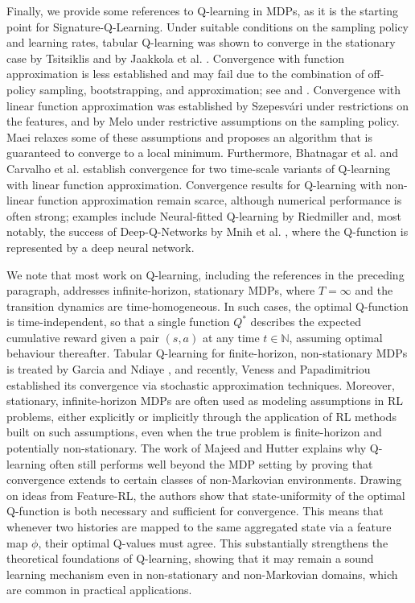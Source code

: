 \documentclass[
    a4paper,
    11pt,
    bibliography=totoc,
    listof=totoc,      
    headinclude=true,
    cleardoublepage=empty,
]{scrbook}
\theoremstyle{plain}
\theoremstyle{definition}
\theoremstyle{remark}
\begin{document}
Finally, we provide some references to Q-learning in MDPs, as it is the 
starting point for Signature-Q-Learning. Under suitable conditions on the sampling 
policy and learning rates, tabular Q-learning was shown to converge in the 
stationary case by Tsitsiklis \cite{tsitsiklis1994_asaq} and by Jaakkola et al. 
\cite{jaakkola1993_csidpa}. Convergence with function approximation is less 
established and may fail due to the combination of off-policy sampling, 
bootstrapping, and approximation; see \cite[Section~11.3]{sutton2018_rli} and 
\cite{hasselt2018_drldt}. 
Convergence with linear function approximation was established by Szepesvári
\cite{szepesvari2004_iq} under restrictions on the features, and by Melo
\cite{melo2008_arlwfa} under restrictive assumptions on the sampling policy.
Maei \cite{maei2010_tolcwfa} relaxes some of these assumptions and proposes an 
algorithm that is guaranteed to converge to a local minimum.
Furthermore, Bhatnagar et al. \cite{bhatnagar2016_mqwlfa} and Carvalho et al.
\cite{carvalho2020_cvqwlfa} establish convergence for two time-scale variants of 
Q-learning with linear function approximation. Convergence results for Q-learning 
with non-linear function approximation remain scarce, although numerical 
performance is often strong; examples include Neural-fitted Q-learning
by Riedmiller \cite{riedmiller2005_nfifewdenrlm} and, most notably, the success 
of Deep-Q-Networks by Mnih et al. \cite{mnih2015_hctdrl}, where the Q-function 
is represented by a deep neural network.

We note that most work on Q-learning, including the references in the
preceding paragraph, addresses infinite-horizon, stationary
MDPs, where $T=\infty$ and the transition dynamics are time-homogeneous. In
such cases, the optimal Q-function is time-independent, so that a single function
$Q^*$ describes the expected cumulative reward given a pair $(s,a)$ at any time
$t\in\mathbb N$, assuming optimal behaviour thereafter. Tabular Q-learning
for finite-horizon, non-stationary MDPs is treated by Garcia and Ndiaye 
\cite{garcia1998_lrarlaf}, and recently, Veness and Papadimitriou 
\cite{vp2024_eemsgwfhq} established its convergence via stochastic approximation 
techniques. Moreover, stationary, infinite-horizon MDPs are often used as modeling 
assumptions in RL problems, either explicitly or implicitly through the application 
of RL methods built on such assumptions, even when the true problem is 
finite-horizon and potentially non-stationary. The work of Majeed and Hutter 
\cite{majeed2018_qcndp} explains why Q-learning often still performs well beyond 
the MDP setting by proving that convergence extends to certain classes of 
non-Markovian environments. Drawing on ideas from Feature-RL, the authors show that
state-uniformity of the optimal Q-function is both necessary and sufficient for 
convergence. This means that whenever two histories are mapped to the same aggregated state via a feature map $\phi$, their optimal Q-values must
agree. This substantially strengthens the theoretical foundations of Q-learning, 
showing that it may remain a sound learning mechanism even in non-stationary and 
non-Markovian domains, which are common in practical applications.
\end{document}
